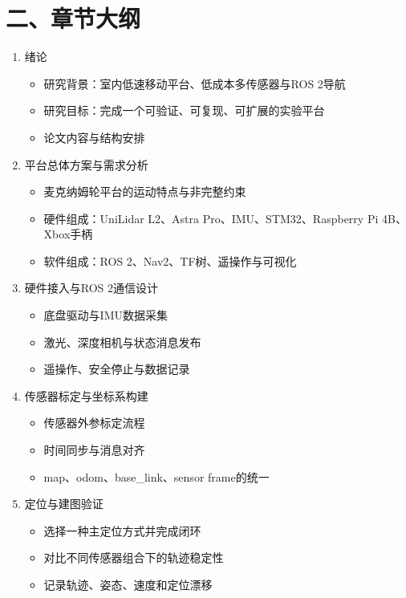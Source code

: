 \documentclass[UTF8,a4paper,11pt]{ctexart}
\begin{document}
\section*{二、章节大纲}
\begin{enumerate}
  \item 绪论
  \begin{itemize}
    \item 研究背景：室内低速移动平台、低成本多传感器与ROS 2导航
    \item 研究目标：完成一个可验证、可复现、可扩展的实验平台
    \item 论文内容与结构安排
  \end{itemize}

  \item 平台总体方案与需求分析
  \begin{itemize}
    \item 麦克纳姆轮平台的运动特点与非完整约束
    \item 硬件组成：UniLidar L2、Astra Pro、IMU、STM32、Raspberry Pi 4B、Xbox手柄
    \item 软件组成：ROS 2、Nav2、TF树、遥操作与可视化
  \end{itemize}

  \item 硬件接入与ROS 2通信设计
  \begin{itemize}
    \item 底盘驱动与IMU数据采集
    \item 激光、深度相机与状态消息发布
    \item 遥操作、安全停止与数据记录
  \end{itemize}

  \item 传感器标定与坐标系构建
  \begin{itemize}
    \item 传感器外参标定流程
    \item 时间同步与消息对齐
    \item map、odom、base\_link、sensor frame的统一
  \end{itemize}

  \item 定位与建图验证
  \begin{itemize}
    \item 选择一种主定位方式并完成闭环
    \item 对比不同传感器组合下的轨迹稳定性
    \item 记录轨迹、姿态、速度和定位漂移
  \end{itemize}


\end{enumerate}
\end{document}
